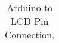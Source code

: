 \documentclass[12pt%
                    ]{report}
\begin{document}
\begin{table}
	\caption{Arduino to LCD Pin Connection.}             %
\begin{tabular}[c]{%
	b{\gnumericColA}%
	b{\gnumericColB}%
	b{\gnumericColC}%
	b{\gnumericColD}%
	}







\end{tabular}
\end{table}
\end{document}
